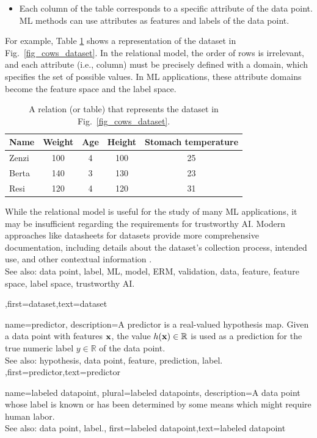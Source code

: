 {{\begin{itemize}
		\item Each column of the table corresponds to a specific attribute of the data point. 
		ML methods can use attributes as features and labels of the data point.
		\end{itemize}
		For example, Table \ref{tab:cowdata} shows a representation of the dataset in Fig.\ \ref{fig_cows_dataset}. 
		In the relational model, the order of rows is irrelevant, and each attribute (i.e., column) must be 
		precisely defined with a domain, which specifies the set of possible values. In ML applications, 
		these attribute domains become the feature space and the label space.
		\begin{table}[H]
			\centering
			\begin{tabular}{lcccc}
				\hline
				\textbf{Name} & \textbf{Weight} & \textbf{Age} & \textbf{Height} & \textbf{Stomach temperature} \\
				\hline
				Zenzi & 100 & 4 & 100 & 25 \\
				Berta & 140 & 3 & 130 & 23 \\
				Resi  & 120 & 4 & 120 & 31 \\
				\hline
			\end{tabular}
			\caption{A relation (or table) that represents the dataset in Fig.\ \ref{fig_cows_dataset}.}
			\label{tab:cowdata}
		\end{table}
 While the relational model is useful for the study of many ML applications, it may be 
 insufficient regarding the requirements for trustworthy AI. Modern 
 approaches like datasheets for datasets provide more comprehensive 
 documentation, including details about the dataset’s collection process, intended 
 use, and other contextual information \cite{DatasheetData2021}.
 		\\
		See also: data point, label, ML, model, ERM, validation, data, feature, feature space, label space, trustworthy AI.},first={dataset},text={dataset}  
}

{name={predictor},
	description={A predictor is a real-valued hypothesis map. 
		Given a data point with features ${\bf x}$, the value 
		$h({\bf x}) \in \mathbb{R}$ is used as a prediction for the true 
		numeric label $y \in \mathbb{R}$ of the data point.
				\\
		See also: hypothesis, data point, feature, prediction, label. },first={predictor},text={predictor}  
}

{name={labeled datapoint}, plural={labeled datapoints},
 description={A data point whose label is known or has been determined 
 	by some means which might require human labor.
			\\
		See also: data point, label.},
 first={labeled datapoint},text={labeled datapoint}  
}

